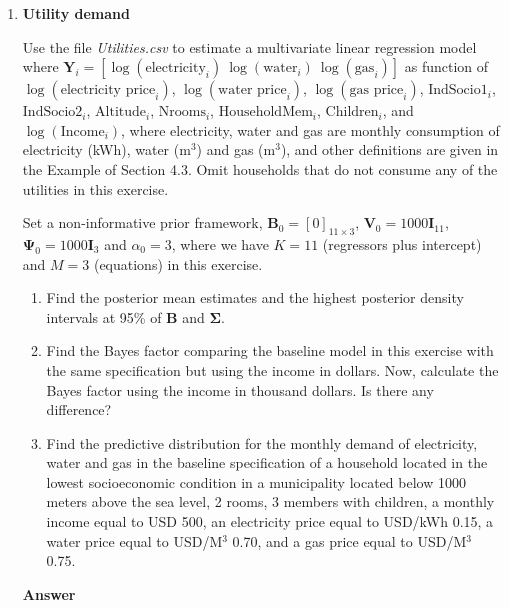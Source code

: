 \begin{enumerate}[leftmargin=*]
The Bayes factor based on the empirical Bayes of the model with electricity price versus the model without electricity price is equal to 71897938, this gives very strong evidence to include the price in the specification.
 
\item \textbf{Utility demand}

Use the file \textit{Utilities.csv} to estimate a multivariate linear regression model where $\mathbf{Y}_i=\left[\log(\text{electricity}_i) \ \log(\text{water}_i) \ \log(\text{gas}_i)\right]$ as function of $\log(\text{electricity price}_i)$, $\log(\text{water price}_i)$, $\log(\text{gas price}_i)$, $\text{IndSocio1}_i$, $\text{IndSocio2}_i$, $\text{Altitude}_i$, $\text{Nrooms}_i$, $\text{HouseholdMem}_i$, $\text{Children}_i$, and $\log(\text{Income}_i)$, where electricity, water and gas are monthly consumption of electricity (kWh), water (m$^3$) and gas (m$^3$), and other definitions are given in the Example of Section 4.3. Omit households that do not consume any of the utilities in this exercise. 

Set a non-informative prior framework, $\mathbf{B}_0=\left[0\right]_{11\times 3}$, $\mathbf{V}_0=1000 \mathbf{I}_{11}$, $\mathbf{\Psi}_0=1000 \mathbf{I}_{3}$ and $\alpha_0=3$, where we have $K=11$ (regressors plus intercept) and $M=3$ (equations) in this exercise.

\begin{enumerate}
	\item Find the posterior mean estimates and the highest posterior density intervals at 95\% of $\mathbf{B}$ and $\mathbf{\Sigma}$.
	\item Find the Bayes factor comparing the baseline model in this exercise with the same specification but using the income in dollars. Now, calculate the Bayes factor using the income in thousand dollars. Is there any difference?
	\item Find the predictive distribution for the monthly demand of electricity, water and gas in the baseline specification of a household located in the lowest socioeconomic condition in a municipality located below 1000 meters above the sea level, 2 rooms, 3 members with children, a monthly income equal to USD 500, an electricity price equal to USD/kWh 0.15, a water price equal to USD/M$^3$ 0.70, and a gas price equal to USD/M$^3$ 0.75. 
\end{enumerate}   

{\textbf{Answer}} 



\end{enumerate}
